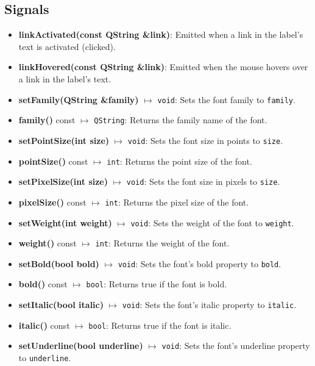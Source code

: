 \documentclass{report}
\begin{document}
    \subsection{Signals}
    \begin{itemize}
        \item \textbf{linkActivated(const QString \&link)}: Emitted when a link in the label's text is activated (clicked).
        \item \textbf{linkHovered(const QString \&link)}: Emitted when the mouse hovers over a link in the label's text.
    \end{itemize}


    \pagebreak 
    \bigbreak \noindent 
    \begin{itemize}
        \item \textbf{setFamily(QString \&family)} $\mapsto$ \texttt{void}: Sets the font family to \texttt{family}.
        \item \textbf{family()} const $\mapsto$ \texttt{QString}: Returns the family name of the font.
        \item \textbf{setPointSize(int size)} $\mapsto$ \texttt{void}: Sets the font size in points to \texttt{size}.
        \item \textbf{pointSize()} const $\mapsto$ \texttt{int}: Returns the point size of the font.
        \item \textbf{setPixelSize(int size)} $\mapsto$ \texttt{void}: Sets the font size in pixels to \texttt{size}.
        \item \textbf{pixelSize()} const $\mapsto$ \texttt{int}: Returns the pixel size of the font.
        \item \textbf{setWeight(int weight)} $\mapsto$ \texttt{void}: Sets the weight of the font to \texttt{weight}.
        \item \textbf{weight()} const $\mapsto$ \texttt{int}: Returns the weight of the font.
        \item \textbf{setBold(bool bold)} $\mapsto$ \texttt{void}: Sets the font's bold property to \texttt{bold}.
        \item \textbf{bold()} const $\mapsto$ \texttt{bool}: Returns true if the font is bold.
        \item \textbf{setItalic(bool italic)} $\mapsto$ \texttt{void}: Sets the font's italic property to \texttt{italic}.
        \item \textbf{italic()} const $\mapsto$ \texttt{bool}: Returns true if the font is italic.
        \item \textbf{setUnderline(bool underline)} $\mapsto$ \texttt{void}: Sets the font's underline property to \texttt{underline}.

\end{itemize}
\end{document}
